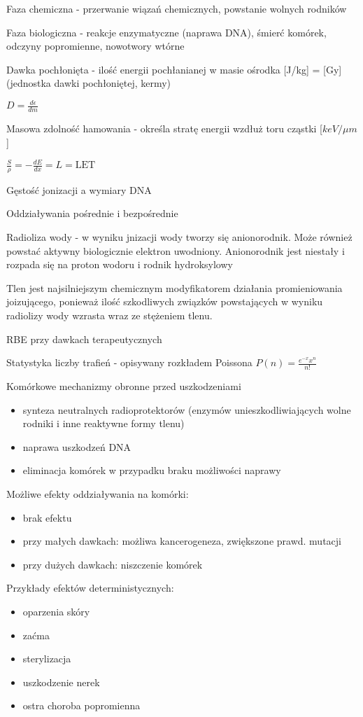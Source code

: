 \documentclass{article}
\begin{document}
Faza chemiczna - przerwanie wiązań chemicznych, powstanie wolnych rodników

Faza biologiczna - reakcje enzymatyczne (naprawa DNA), śmierć komórek, odczyny popromienne, nowotwory wtórne

Dawka pochłonięta - ilość energii pochłanianej w masie ośrodka [J/kg] = [Gy] (jednostka dawki pochłoniętej, kermy)

$D = \frac{d\epsilon}{dm}$ 

Masowa zdolność hamowania - określa stratę energii wzdłuż toru cząstki [$keV/\mu m$]

$\frac{S}{\rho} = - \frac{dE}{dx} = L = \mathrm{LET}$

Gęstość jonizacji a wymiary DNA

Oddziaływania pośrednie i bezpośrednie

Radioliza wody - w wyniku jnizacji wody tworzy się anionorodnik. Może również powstać aktywny biologicznie elektron uwodniony. Anionorodnik jest niestały i rozpada się na proton wodoru i rodnik hydroksylowy

Tlen jest najsilniejszym chemicznym modyfikatorem działania promieniowania joizującego, ponieważ ilość szkodliwych związków powstających w wyniku radiolizy wody wzrasta wraz ze stężeniem tlenu.

RBE przy dawkach terapeutycznych

Statystyka liczby trafień - opisywany rozkładem Poissona $P(n) = \frac{e^{-x}x^n}{n!}$

Komórkowe mechanizmy obronne przed uszkodzeniami
\begin{itemize}
    \item synteza neutralnych radioprotektorów (enzymów unieszkodliwiających wolne rodniki i inne reaktywne formy tlenu)
    \item naprawa uszkodzeń DNA
    \item eliminacja komórek w przypadku braku możliwości naprawy
\end{itemize}

Możliwe efekty oddziaływania na komórki:
\begin{itemize}
    \item brak efektu
    \item przy małych dawkach: możliwa kancerogeneza, zwiększone prawd. mutacji
    \item przy dużych dawkach: niszczenie komórek
\end{itemize}

Przykłady efektów deterministycznych:
\begin{itemize}
    \item oparzenia skóry
    \item zaćma
    \item sterylizacja
    \item uszkodzenie nerek
    \item ostra choroba popromienna
\end{itemize}
\end{document}
